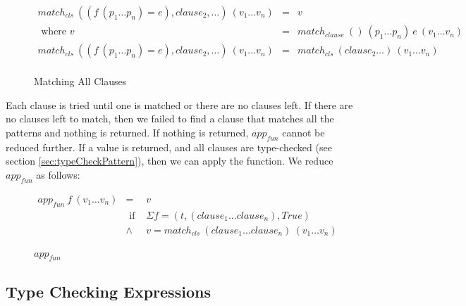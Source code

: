 \begin{figure}[H]
  \begin{equation*}
    \begin{aligned}
      match_{cls} \: ((f \: (p_1 \dots p_n) = e), clause_2, \dots) \: (v_1 \dots v_n) & = & v                                                               \\
      \textrm{ where } v                                                              & = & match_{clause} \: () \: (p_1 \dots p_n) \: e \: (v_1 \dots v_n) \\
      match_{cls} \: ((f \: (p_1 \dots p_n) = e), clause_2, \dots) \: (v_1 \dots v_n) & = & match_{cls} \: (clause_2 \dots) \: (v_1 \dots v_n)              \\
    \end{aligned}
  \end{equation*}
  \caption{Matching All Clauses}
\end{figure}

Each clause is tried until one is matched or there are no clauses left. If there are no clauses left to match, then we failed to find a clause that matches all the patterns and nothing is returned. If nothing is returned, $app_{fun}$ cannot be reduced further. If a value is returned, and all clauses are type-checked (see section \ref{sec:typeCheckPattern}), then we can apply the function. We reduce $app_{fun}$ as follows:

\begin{figure}[H]
  \begin{equation*}
    \begin{aligned}
      app_{fun} \: f \: (v_1 \dots v_n) & =             & v                                                               \\
                                        & \textrm{ if } & \Sigma f = (t, (clause_1 \dots clause_n), True)                 \\
                                        & \land         & v = match_{cls} \: (clause_1 \dots clause_n) \: (v_1 \dots v_n) \\
    \end{aligned}
  \end{equation*}
  \caption{$app_{fun}$}
\end{figure}

\subsection{Type Checking Expressions}

